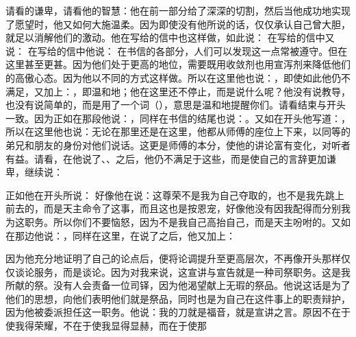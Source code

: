 请看的谦卑，请看他的智慧：他在前一部分给了深深的切割，然后当他成功地实现了愿望时，他又如何大施温柔。因为即使没有他所说的话，仅仅承认自己曾大胆，就足以消解他们的激动。他在写给的信中也这样做，如此说： 在写给的信中又说： 在写给的信中他说： 在书信的各部分，人们可以发现这一点常被遵守。但在这里甚至更甚。因为他们处于更高的地位，需要既用收敛剂也用宣泻剂来降低他们的高傲心态。因为他以不同的方式这样做。所以在这里他也说：，即使如此他仍不满足，又加上：，即温和地；他在这里还不停止，而是说什么呢？他没有说教导，也没有说简单的，而是用了一个词（），意思是温和地提醒你们。请看结束与开头一致。因为正如在那段他说：，同样在书信的结尾也说：。又如在开头他写道：，所以在这里他也说：无论在那里还是在这里，他都从师傅的座位上下来，以同等的弟兄和朋友的身份对他们说话。这更是师傅的本分，使他的讲论富有变化，对听者有益。请看，在他说了、、之后，他仍不满足于这些，而是使自己的言辞更加谦卑，继续说：\par

正如他在开头所说： 好像他在说：这尊荣不是我为自己夺取的，也不是我先跳上前去的，而是天主命令了这事，而且这也是按恩宠，好像他没有因我配得而分别我为这职务。所以你们不要恼怒，因为不是我自己高抬自己，而是天主吩咐的。又如在那边他说：，同样在这里，在说了之后，他又加上：\par

  \par

因为他充分地证明了自己的论点后，便将论调提升至更高层次，不再像开头那样仅仅谈论服务，而是谈论。因为对我来说，这宣讲与宣告就是一种司祭职务。这是我所献的祭。没有人会责备一位司铎，因为他渴望献上无瑕的祭品。他说这话是为了他们的思想，向他们表明他们就是祭品，同时也是为自己在这件事上的职责辩护，因为他被委派担任这一职务。他说：我的刀就是福音，就是宣讲之言。原因不在于使我得荣耀，不在于使我显得显赫，而在于使那\par

